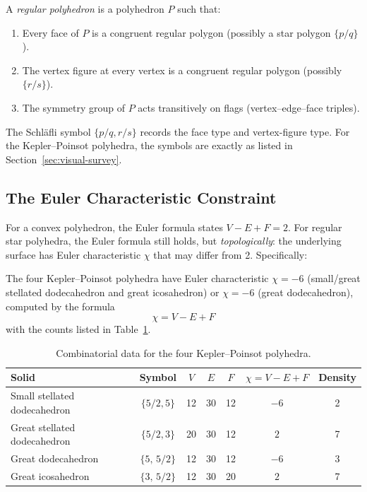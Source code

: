 \begin{definition}
\label{def:regular-polyhedron}
A \emph{regular polyhedron} is a polyhedron \(P\) such that:
\begin{enumerate}
  \item Every face of \(P\) is a congruent regular polygon
        (possibly a star polygon \(\{p/q\}\)).
  \item The vertex figure at every vertex is a congruent
        regular polygon (possibly \(\{r/s\}\)).
  \item The symmetry group of \(P\) acts transitively on
        flags (vertex–edge–face triples).
\end{enumerate}
\end{definition}

The Schläfli symbol \(\{p/q, r/s\}\) records the face type and
vertex-figure type.  For the Kepler–Poinsot polyhedra, the
symbols are exactly as listed in Section~\ref{sec:visual-survey}.

\subsection{The Euler Characteristic Constraint}
\label{ssec:euler}

For a convex polyhedron, the Euler formula states
\(V - E + F = 2\).  For regular star polyhedra, the Euler
formula still holds, but \emph{topologically}: the underlying
surface has Euler characteristic $\chi$ that may differ from
2.  Specifically:

\begin{proposition}
\label{prop:euler-kp}
The four Kepler–Poinsot polyhedra have Euler characteristic
\(\chi = -6\) (small/great stellated dodecahedron and great
icosahedron) or \(\chi = -6\) (great dodecahedron), computed
by the formula
\[
  \chi = V - E + F
\]
with the counts listed in Table~\ref{tab:kp-data}.
\end{proposition}

\begin{table}[h]
\centering
\caption{Combinatorial data for the four Kepler–Poinsot polyhedra.}
\label{tab:kp-data}
\begin{tabular}{lcccccc}
\hline
Solid & Symbol & $V$ & $E$ & $F$ & $\chi = V-E+F$ & Density\\
\hline
Small stellated dodecahedron & $\{5/2,5\}$   & 12 & 30 & 12 & $-6$ & 2\\
Great stellated dodecahedron & $\{5/2,3\}$   & 20 & 30 & 12 & $2$  & 7\\
Great dodecahedron           & $\{5,\,5/2\}$ & 12 & 30 & 12 & $-6$ & 3\\
Great icosahedron            & $\{3,\,5/2\}$ & 12 & 30 & 20 & $2$  & 7\\
\hline
\end{tabular}
\end{table}

